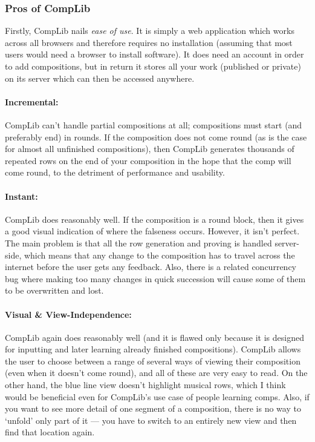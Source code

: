 \documentclass[12pt]{article}
\begin{document}
\subsubsection{Pros of CompLib}

Firstly, CompLib nails \emph{ease of use}.  It is simply a web application which works across all
browsers and therefore requires no installation (assuming that most users would need a browser to
install software).  It does need an account in order to add compositions, but in return it stores
all your work (published or private) on its server which can then be accessed anywhere.

\paragraph{Incremental:}  CompLib can't handle partial compositions at all; compositions must start
(and preferably end) in rounds.  If the composition does not come round (as is the case for almost
all unfinished compositions), then CompLib generates thousands of repeated rows on the end of your
composition in the hope that the comp will come round, to the detriment of performance and
usability.

\paragraph{Instant:}  CompLib does reasonably well.  If the composition is a round block, then it
gives a good visual indication of where the falseness occurs.  However, it isn't perfect.  The main
problem is that all the row generation and proving is handled server-side, which means that any
change to the composition has to travel across the internet before the user gets any feedback.
Also, there is a related concurrency bug where making too many changes in quick succession will
cause some of them to be overwritten and lost.

\paragraph{Visual \& View-Independence:}  CompLib again does reasonably well (and it is flawed only
because it is designed for inputting and later learning already finished compositions).
CompLib allows the user to choose between a range of several ways of viewing their composition (even
when it doesn't come round), and all of these are very easy to read.  On the other hand, the
blue line view doesn't highlight musical rows, which I think would be beneficial even for CompLib's
use case of people learning comps.  Also, if you want to see more detail of one segment of a
composition, there is no way to `unfold' only part of it --- you have to switch to an entirely new
view and then find that location again.
\end{document}
